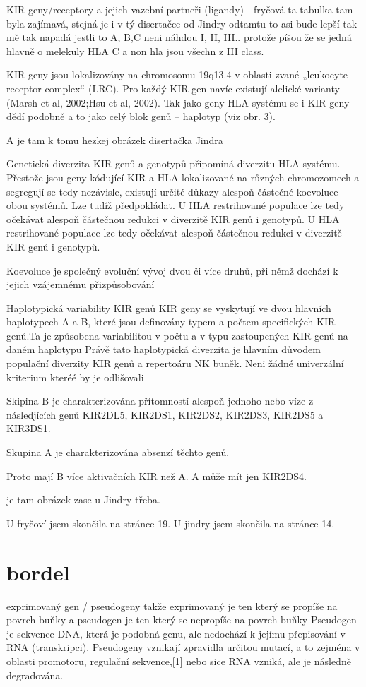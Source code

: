\documentclass[czech,DP]{thesiskiv}
\begin{document}
KIR geny/receptory a jejich vazební partneři (ligandy)
- fryčová ta tabulka tam byla zajímavá, stejná je i v tý disertačce od Jindry odtamtu to asi bude lepší
tak mě tak napadá jestli to A, B,C neni náhdou I, II, III.. protože píšou že se jedná hlavně o melekuly HLA C a non hla jsou všechn z III class.


KIR geny jsou lokalizovány na chromosomu 19q13.4 v oblasti zvané „leukocyte receptor
complex“ (LRC). Pro každý KIR gen navíc existují alelické varianty (Marsh et al, 2002;Hsu
et al, 2002). Tak jako geny HLA systému se i KIR geny dědí podobně a to jako celý blok
genů – haplotyp (viz obr. 3).

A je tam k tomu hezkej obrázek disertačka Jindra

Genetická diverzita KIR genů a genotypů připomíná diverzitu HLA
systému. Přestože jsou geny kódující KIR a HLA lokalizované na
různých chromozomech a segregují se tedy nezávisle, existují určité
důkazy alespoň částečné koevoluce obou systémů. Lze tudíž
předpokládat. U HLA restrihované populace lze tedy očekávat
alespoň částečnou redukci v diverzitě KIR genů i genotypů.
U HLA restrihované populace lze tedy očekávat
alespoň částečnou redukci v diverzitě KIR genů i genotypů.

Koevoluce je společný evoluční vývoj dvou či více druhů, při němž dochází k jejich vzájemnému přizpůsobování

Haplotypická variability KIR genů
KIR geny se vyskytují ve dvou hlavních haplotypech A a B, které jsou definovány typem a počtem specifických KIR genů.Ta je způsobena variabilitou v počtu a v typu
zastoupených KIR genů na daném haplotypu
Právě tato
haplotypická diverzita je hlavním důvodem populační diverzity KIR
genů a repertoáru NK buněk.
Neni žádné univerzální kriterium kteréé by je odlišovali

Skipina B je charakterizována přítomností alespoň jednoho nebo víze z následjících genů KIR2DL5, KIR2DS1, KIR2DS2, KIR2DS3, KIR2DS5 a KIR3DS1.

Skupina A je charakterizována absenzí těchto genů. 

Proto mají B více aktivačních KIR než A. A může mít jen KIR2DS4.

je tam obrázek zase u Jindry třeba.

U fryčoví jsem skončila na stránce 19. 
U jindry jsem skončila na stránce 14.





\section{bordel}
exprimovaný gen / pseudogeny
takže exprimovaný je ten který se propíše na povrch buňky a pseudogen je ten který se nepropíše na povrch buňky
Pseudogen je sekvence DNA, která je podobná genu, ale nedochází k jejímu přepisování v RNA (transkripci). Pseudogeny vznikají zpravidla určitou mutací, a to zejména v oblasti promotoru, regulační sekvence,[1] nebo sice RNA vzniká, ale je následně degradována.
\end{document}
